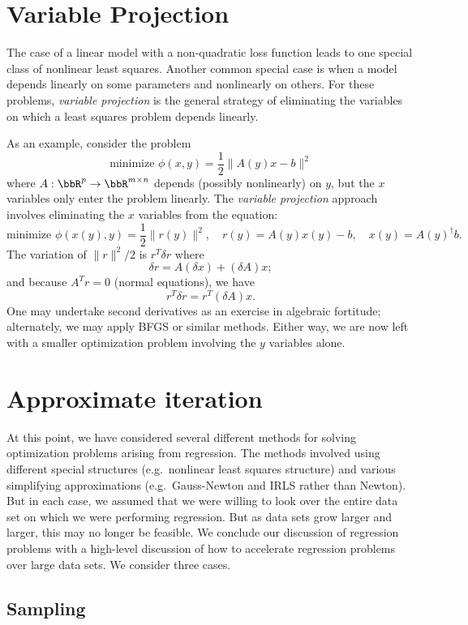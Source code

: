 \documentclass[12pt, leqno]{article} %
\begin{document}

\section{Variable Projection}

The case of a linear model with a non-quadratic loss function leads to
one special class of nonlinear least squares.  Another common special
case is when a model depends linearly on some parameters and
nonlinearly on others.  For these problems, {\em variable projection}
is the general strategy of eliminating the variables on which a least
squares problem depends linearly.

As an example, consider the problem
\[
  \mbox{minimize } \phi(x,y) = \frac{1}{2} \|A(y) x-b\|^2
\]
where $A : \bbR^p \rightarrow \bbR^{m \times n}$ depends (possibly
nonlinearly) on $y$, but the $x$ variables only enter the problem
linearly.  The {\em variable projection} approach involves
eliminating the $x$ variables from the equation:
\[
  \mbox{minimize } \phi(x(y), y) =
  \frac{1}{2} \|r(y)\|^2,
  \quad r(y) = A(y) x(y) - b,
  \quad x(y) = A(y)^\dagger b.
\]
The variation of $\|r\|^2/2$ is $r^T \delta r$ where
\[
  \delta r = A (\delta x) + (\delta A) x;
\]
and because $A^T r = 0$ (normal equations), we have
\[
  r^T \delta r = r^T (\delta A) x.
\]
One may undertake second derivatives as an exercise in algebraic
fortitude; alternately, we may apply BFGS or similar methods.
Either way, we are now left with a smaller optimization problem
involving the $y$ variables alone.

\section{Approximate iteration}

At this point, we have considered several different methods for
solving optimization problems arising from regression.  The
methods involved using different special structures (e.g.~nonlinear
least squares structure) and various simplifying approximations
(e.g.~Gauss-Newton and IRLS rather than Newton).  But in each case,
we assumed that we were willing to look over the entire data set on
which we were performing regression.  But as data sets grow larger and
larger, this may no longer be feasible.  We conclude our discussion
of regression problems with a high-level discussion of how to accelerate
regression problems over large data sets.  We consider three cases.

\subsection{Sampling}
\end{document}
